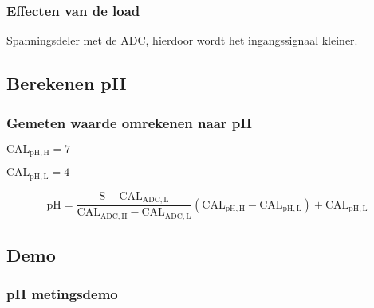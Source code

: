     \begin{frame}
        \frametitle{Effecten van de load}
    
        Spanningsdeler met de ADC, hierdoor wordt het ingangssignaal kleiner.
    
    \end{frame}

    \subsection*{Berekenen pH}
    \begin{frame}
        \frametitle{Gemeten waarde omrekenen naar pH}
    
        $\mathrm{CAL_{\mathrm{pH,H}}}=7$

        $\mathrm{CAL_{\mathrm{pH,L}}}=4$

        \begin{equation}
            \mathrm{pH}=\frac{\mathrm{S}-\mathrm{CAL_{\mathrm{ADC,L}}}}{\mathrm{CAL_{\mathrm{ADC,H}}}-\mathrm{CAL_{\mathrm{ADC,L}}}}\left(\mathrm{CAL_{\mathrm{pH,H}}}-\mathrm{CAL_{\mathrm{pH,L}}}\right)+\mathrm{CAL_{\mathrm{pH,L}}}
        \end{equation}
    
    \end{frame}

    \subsection*{Demo}
    \begin{frame}
        \frametitle{pH metingsdemo}
    
        
    
    \end{frame}